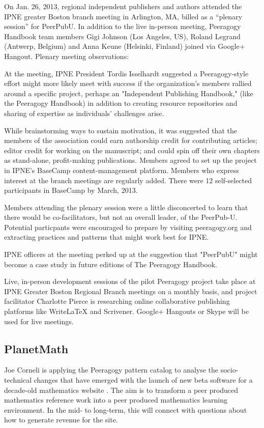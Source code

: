 \documentclass{acm_proc_article-sp}
\begin{document}
On Jan. 26, 2013, regional independent publishers and authors attended
the IPNE greater Boston branch meeting in Arlington, MA, billed as
a ``plenary session'' for PeerPubU. In addition to the live in-person
meeting, Peeragogy Handbook team members Gigi Johnson (Los Angeles,
US), Roland Legrand (Antwerp, Belgium) and Anna Keune (Helsinki,
Finland) joined via Google+ Hangout. Plenary meeting observations:

At the meeting, IPNE President Tordis Isselhardt suggested a Peeragogy-style effort might more likely meet with success if the organization's members rallied around a specific project, perhaps an "Independent Publishing Handbook," (like the Peeragogy Handbook) in addition to creating resource repositories and sharing of expertise as individuals' challenges arise.

While brainstorming ways to sustain motivation, it was suggested that the members of the association could earn authorship credit for contributing articles; editor credit for working on the manuscript; and could spin off their own chapters as stand-alone, profit-making publications. Members agreed to set up the project in IPNE's BaseCamp content-management platform. Members who express interest at the branch meetings are regularly added. There were 12 self-selected participants in BaseCamp by March, 2013.

Members attending the plenary session were a little disconcerted to learn that there would be co-facilitators, but not an overall leader, of the PeerPub-U. Potential particpants were encouraged to prepare by visiting peeragogy.org and
extracting practices and patterns that might work best for IPNE.

IPNE officers at the meeting perked up at the suggestion that "PeerPubU" might become a case study in future editions of The Peeragogy Handbook.

Live, in-person development sessions of the pilot Peeragogy project take place at IPNE Greater Boston Regional Branch meetings on a monthly basis, and project facilitator Charlotte Pierce is researching online collaborative publishing platforms like WriteLaTeX and Scrivener. Google+ Hangouts or Skype will be used for live meetings.

\subsection{PlanetMath}

Joe Corneli is applying the Peeragogy pattern catalog to analyse the socio-technical changes that have emerged with the launch of new beta software for a decade-old mathematics website \cite{corneli-thesis}.  The aim is to transform a peer produced mathematics reference work into a peer produced mathematics learning environment.  In the mid- to long-term, this will connect with questions about how to generate revenue for the site.
\end{document}
